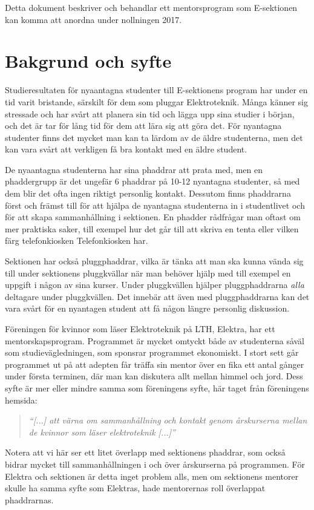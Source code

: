 \documentclass[10pt]{article}
\def\doctitle{E-sektionens mentorsprogram 2017}
\begin{document}
    \heading{\doctitle}

    Detta dokument beskriver och behandlar ett mentorsprogram som E-sektionen kan komma att anordna under nollningen 2017.

    \section*{Bakgrund och syfte}
    Studieresultaten för nyaantagna studenter till E-sektionens program har under en tid varit bristande, särskilt för dem som pluggar Elektroteknik.
    Många känner sig stressade och har svårt att planera sin tid och lägga upp sina studier i början, och det är tar för lång tid för dem att lära sig att göra det.
    För nyantagna studenter finns det mycket man kan ta lärdom av de äldre studenterna, men det kan vara svårt att verkligen få bra kontakt med en äldre student.

    De nyaantagna studenterna har sina phaddrar att prata med, men en phaddergrupp är det ungefär 6 phaddrar på 10-12 nyantagna studenter, så med dem blir det ofta ingen riktigt personlig kontakt.
    Dessutom finns phaddrarna först och främst till för att hjälpa de nyantagna studenterna in i studentlivet och för att skapa sammanhållning i sektionen.
    En phadder rådfrågar man oftast om mer praktiska saker, till exempel hur det går till att skriva en tenta eller vilken färg telefonkiosken Telefonkiosken har.

    Sektionen har också pluggphaddrar, vilka är tänka att man ska kunna vända sig till under sektionens pluggkvällar när man behöver hjälp med till exempel en uppgift i någon av sina kurser.
    Under pluggkvällen hjälper pluggphaddrarna \emph{alla} deltagare under pluggkvällen.
    Det innebär att även med pluggphaddrarna kan det vara svårt för en nyantagen student att få någon längre personlig diskussion.

    Föreningen för kvinnor som läser Elektroteknik på LTH, Elektra, har ett mentorskapsprogram.
    Programmet är mycket omtyckt både av studenterna såväl som studievägledningen, som sponsrar programmet ekonomiskt.
    I stort sett går programmet ut på att adepten får träffa sin mentor över en fika ett antal gånger under första terminen, där man kan diskutera allt mellan himmel och jord.
    Dess syfte är mer eller mindre samma som föreningens syfte, här taget från föreningens hemsida:
    \begin{quote}
    \emph{``[...] att värna om sammanhållning och kontakt genom årskurserna mellan de kvinnor som läser elektroteknik [...]''}
    \end{quote}
    Notera att vi här ser ett litet överlapp med sektionens phaddrar, som också bidrar mycket till sammanhållningen i och över årskurserna på programmen.
    För Elektra och sektionen är detta inget problem alls, men om sektionens mentorer skulle ha samma syfte som Elektras, hade mentorernas roll överlappat phaddrarnas.
\end{document}
